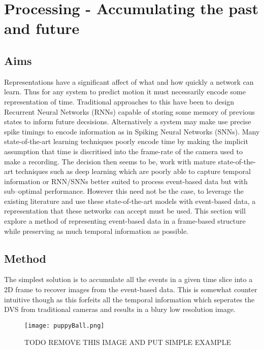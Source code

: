 \chapter{Processing - Accumulating the past and future}
\label{ch:preprocess}

\section{Aims}
Representations have a significant affect of what and how quickly a network can learn\cite{akolkar2015can}. 
Thus for any system to predict motion it must necessarily encode some representation of time. 
Traditional approaches to this have been to design Recurrent Neural Networks (RNNs) capable of storing some memory of previous states to inform future decsisions.  
Alternatively a system may make use precise spike timings to encode information as in Spiking Neural Networks (SNNs). 
Many state-of-the-art learning techniques poorly encode time by making the implicit assumption that time is discritised into the frame-rate of the camera used to make a recording.
The decision then seems to be, work with mature state-of-the-art techniques such as deep learning which are poorly able to capture temporal information or RNN/SNNs better suited to process event-based data but with sub--optimal performance.   
However this need not be the case, to leverage the existing literature and use these state-of-the-art models with event-based data, a representation that these networks can accept must be used. 
This section will explore a method of representing event-based data in a frame-based structure while preserving as much temporal information as possible. 


\section{Method}
The simplest solution is to accumulate all the events in a given time slice into a 2D frame to recover images from the event-based data.
This is somewhat counter intuitive though as this forfeits all the temporal information which seperates the DVS from traditional cameras and results in a blury low resolution image. 

\begin{wrapfigure}{r}{0.3\textwidth}
    \centering
    \texttt{[image: puppyBall.png]}
    \caption{TODO REMOVE THIS IMAGE AND PUT SIMPLE EXAMPLE}
    \label{fig:fadedhistory}
\end{wrapfigure}

